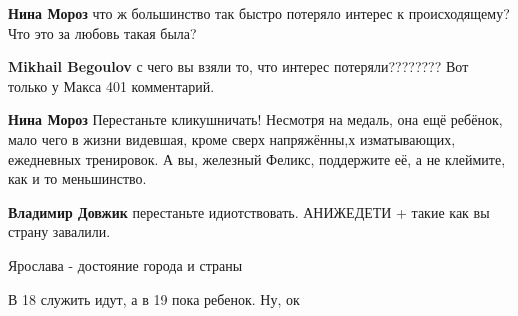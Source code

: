 \begin{itemize}
\begin{itemize}
 
\textbf{Нина Мороз} что ж большинство так быстро потеряло интерес к происходящему? Что это за любовь такая была?

 
\textbf{Mikhail Begoulov} с чего вы взяли то, что интерес потеряли???????? Вот только у Макса 401 комментарий.

 
\textbf{Нина Мороз} Перестаньте кликушничать! Несмотря на медаль, она ещё ребёнок, мало чего в жизни видевшая, кроме сверх напряжённы,х изматывающих, ежедневных тренировок. А вы, железный Феликс, поддержите её, а не клеймите, как и то меньшинство.

 
\textbf{Владимир Довжик} перестаньте идиотствовать. АНИЖЕДЕТИ + такие как вы страну завалили.
\end{itemize}

 
Ярослава - достояние города и страны


В 18 служить идут, а в 19 пока ребенок. Ну, ок


\end{itemize}
